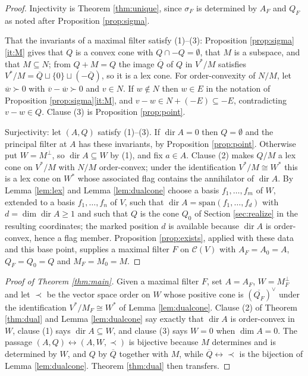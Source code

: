 \documentclass[11pt]{amsart}
\theoremstyle{plain}
\theoremstyle{definition}
\DeclareMathOperator{\dir}{dir}
\newcommand{\CC}{\mathscr{C}}
\newcommand{\Vs}{V^{*}}
\begin{document}
\begin{proof}
Injectivity is Theorem \ref{thm:unique}, since $\sigma_F$ is determined by $A_F$ and $Q_F$ as noted after Proposition \ref{prop:sigma}.

That the invariants of a maximal filter satisfy (1)--(3): Proposition \ref{prop:sigma}\eqref{it:M} gives that $Q$ is a convex cone with $Q\cap-Q=\emptyset$, that $M$ is a subspace, and that $M\subseteq N$; from $Q+M=Q$ the image $\overline{Q}$ of $Q$ in $\Vs/M$ satisfies $\Vs/M=\overline{Q}\sqcup\{0\}\sqcup(-\overline{Q})$, so it is a lex cone. For order-convexity of $N/M$, let $\overline{w}\succ0$ with $\overline{v}-\overline{w}\succ0$ and $v\in N$. If $w\notin N$ then $w\in E$ in the notation of Proposition \ref{prop:sigma}\eqref{it:M}, and $v-w\in N+(-E)\subseteq-E$, contradicting $v-w\in Q$. Clause (3) is Proposition \ref{prop:point}.

Surjectivity: let $(A,Q)$ satisfy (1)--(3). If $\dir A=0$ then $Q=\emptyset$ and the principal filter at $A$ has these invariants, by Proposition \ref{prop:point}. Otherwise put $W=M^{\perp}$, so $\dir A\subseteq W$ by (1), and fix $a\in A$. Clause (2) makes $Q/M$ a lex cone on $\Vs/M$ with $N/M$ order-convex; under the identification $\Vs/M\cong W^{*}$ this is a lex cone on $W^{*}$ whose associated flag contains the annihilator of $\dir A$. By Lemma \ref{lem:lex} and Lemma \ref{lem:dualcone} choose a basis $f_1,\dots,f_m$ of $W$, extended to a basis $f_1,\dots,f_n$ of $V$, such that $\dir A=\mathrm{span}(f_1,\dots,f_d)$ with $d=\dim\dir A\ge1$ and such that $Q$ is the cone $Q_0$ of Section \ref{sec:realize} in the resulting coordinates; the marked position $d$ is available because $\dir A$ is order-convex, hence a flag member. Proposition \ref{prop:exists}, applied with these data and this base point, supplies a maximal filter $F$ on $\CC(V)$ with $A_F=A_0=A$, $Q_F=Q_0=Q$ and $M_F=M_0=M$.
\end{proof}

\begin{proof}[Proof of Theorem \ref{thm:main}]
Given a maximal filter $F$, set $A=A_F$, $W=M_F^{\perp}$ and let $\prec$ be the vector space order on $W$ whose positive cone is $(\overline{Q_F})^{\vee}$ under the identification $\Vs/M_F\cong W^{*}$ of Lemma \ref{lem:dualcone}. Clause (2) of Theorem \ref{thm:dual} and Lemma \ref{lem:dualcone} say exactly that $\dir A$ is order-convex in $W$, clause (1) says $\dir A\subseteq W$, and clause (3) says $W=0$ when $\dim A=0$. The passage $(A,Q)\leftrightarrow(A,W,\prec)$ is bijective because $M$ determines and is determined by $W$, and $Q$ by $\overline{Q}$ together with $M$, while $\overline{Q}\leftrightarrow\prec$ is the bijection of Lemma \ref{lem:dualcone}. Theorem \ref{thm:dual} then transfers.
\end{proof}
\end{document}
